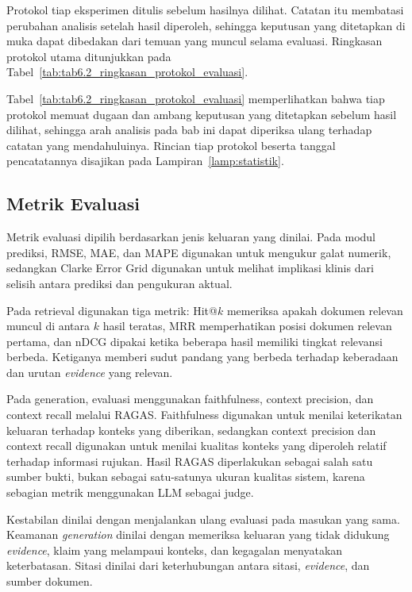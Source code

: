 Protokol tiap eksperimen ditulis sebelum hasilnya dilihat. Catatan itu membatasi perubahan analisis setelah hasil diperoleh, sehingga keputusan yang ditetapkan di
muka dapat dibedakan dari temuan yang muncul selama evaluasi. Ringkasan protokol utama ditunjukkan pada Tabel~\ref{tab:tab6.2_ringkasan_protokol_evaluasi}.



Tabel~\ref{tab:tab6.2_ringkasan_protokol_evaluasi} memperlihatkan bahwa tiap protokol memuat dugaan dan ambang keputusan yang ditetapkan sebelum hasil dilihat,
sehingga arah analisis pada bab ini dapat diperiksa ulang terhadap catatan yang mendahuluinya. Rincian tiap protokol beserta tanggal pencatatannya disajikan pada Lampiran~\ref{lamp:statistik}.

\subsection{Metrik Evaluasi}
\label{subsec:bab6-metrik-evaluasi}

Metrik evaluasi dipilih berdasarkan jenis keluaran yang dinilai. Pada modul prediksi, RMSE, MAE, dan MAPE digunakan untuk mengukur galat numerik, sedangkan Clarke
Error Grid digunakan untuk melihat implikasi klinis dari selisih antara prediksi dan pengukuran aktual.

Pada retrieval digunakan tiga metrik: Hit@$k$ memeriksa apakah dokumen relevan muncul di antara $k$ hasil teratas, MRR memperhatikan posisi dokumen relevan
pertama, dan nDCG dipakai ketika beberapa hasil memiliki tingkat relevansi berbeda. Ketiganya memberi sudut pandang yang berbeda terhadap keberadaan dan
urutan \textit{evidence} yang relevan.

Pada generation, evaluasi menggunakan faithfulness, context precision, dan context recall melalui RAGAS. Faithfulness digunakan untuk menilai keterikatan keluaran
terhadap konteks yang diberikan, sedangkan context precision dan context recall digunakan untuk menilai kualitas konteks yang diperoleh relatif terhadap informasi
rujukan. Hasil RAGAS diperlakukan sebagai salah satu sumber bukti, bukan sebagai satu-satunya ukuran kualitas sistem, karena sebagian metrik menggunakan LLM sebagai
judge.

Kestabilan dinilai dengan menjalankan ulang evaluasi pada masukan yang sama. Keamanan \textit{generation} dinilai dengan memeriksa keluaran yang tidak didukung
\textit{evidence}, klaim yang melampaui konteks, dan kegagalan menyatakan keterbatasan. Sitasi dinilai dari keterhubungan antara sitasi, \textit{evidence}, dan
sumber dokumen.

